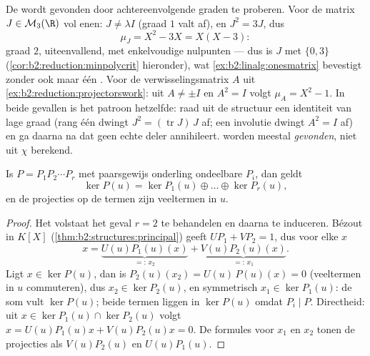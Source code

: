 \begin{example}\label{ex:b2:reduction:minpolyhand}
De  wordt gevonden door achtereenvolgende graden
te proberen. Voor de matrix $J \in \mathcal{M}_3(\R)$ vol enen:
$J \neq \lambda I$ (graad $1$ valt af), en $J^2 = 3J$, dus
\[
\mu_J = X^2 - 3X = X(X - 3) :
\]
graad $2$, uiteenvallend, met enkelvoudige nulpunten --- dus is $J$
 met  $\{0, 3\}$
(\cref{cor:b2:reduction:minpolycrit} hieronder), wat
\cref{ex:b2:linalg:onesmatrix} bevestigt zonder ook maar één
. Voor de verwisselingsmatrix $A$ uit
\cref{ex:b2:reduction:projectorswork}: uit $A \neq \pm I$ en $A^2 =
I$ volgt $\mu_A = X^2 - 1$. In beide gevallen is het patroon
hetzelfde: raad uit de structuur een identiteit van lage graad
(rang één dwingt $J^2 = (\operatorname{tr}J)\,J$ af; een involutie
dwingt $A^2 = I$ af) en ga daarna na dat geen echte deler
annihileert.  worden meestal \emph{gevonden},
niet uit $\chi$ berekend.
\end{example}

\begin{theorem}[Kernontbindingslemma]\label{thm:b2:reduction:kernels}
Is $P = P_1 P_2 \cdots P_r$ met paarsgewijs onderling ondeelbare
$P_i$, dan geldt
\[
\ker P(u) = \ker P_1(u) \oplus \dots \oplus \ker P_r(u),
\]
en de projecties op de termen zijn veeltermen in $u$.
\end{theorem}

\begin{proof}
Het volstaat het geval $r = 2$ te behandelen en daarna te
induceren. Bézout in $K[X]$ (\cref{thm:b2:structures:principal})
geeft $U P_1 + V P_2 = 1$, dus voor elke $x$
\[
x = \underbrace{U(u)P_1(u)(x)}_{=:\,x_2}
+ \underbrace{V(u)P_2(u)(x)}_{=:\,x_1}.
\]
Ligt $x \in \ker P(u)$, dan is $P_2(u)(x_2) = U(u)\,P(u)(x) = 0$
(veeltermen in $u$ commuteren), dus $x_2 \in \ker P_2(u)$, en
symmetrisch $x_1 \in \ker P_1(u)$: de som vult $\ker P(u)$; beide
termen liggen in $\ker P(u)$ omdat $P_i \mid P$. Directheid: uit $x
\in \ker P_1(u) \cap \ker P_2(u)$ volgt $x = U(u)P_1(u)x +
V(u)P_2(u)x = 0$. De formules voor $x_1$ en $x_2$ tonen de
projecties als $V(u)P_2(u)$ en $U(u)P_1(u)$.
\end{proof}

